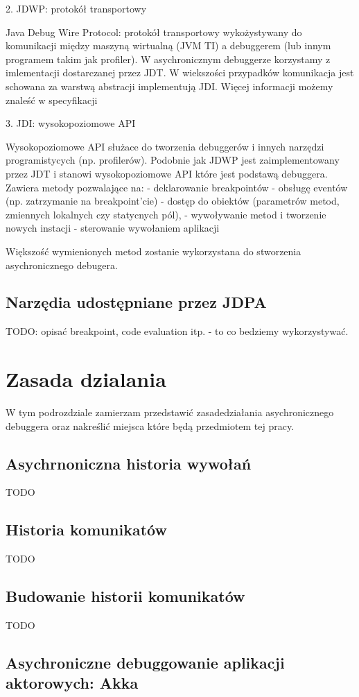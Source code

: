 2. JDWP: protokół transportowy

Java Debug Wire Protocol: protokół transportowy wykożystywany do komunikacji między maszyną wirtualną (JVM TI) a debuggerem (lub innym programem takim jak profiler). W asychronicznym debuggerze korzystamy z imlementacji dostarczanej przez JDT. W wiekszości przypadków komunikacja jest schowana za warstwą abstracji implementują JDI. Więcej informacji możemy znaleść w specyfikacji\cite{jwdpSpec}

3. JDI: wysokopoziomowe API

Wysokopoziomowe API służace do tworzenia debuggerów i innych narzędzi programistycych (np. profilerów). Podobnie jak JDWP jest zaimplementowany przez JDT i stanowi wysokopoziomowe API które jest podstawą debuggera.
Zawiera metody pozwalające na:
- deklarowanie breakpointów
- obsługę eventów (np. zatrzymanie na breakpoint'cie)
- dostęp do obiektów (parametrów metod, zmiennych lokalnych czy statycnych pól),
- wywoływanie metod i tworzenie nowych instacji
- sterowanie wywołaniem aplikacji

Większość wymienionych metod zostanie wykorzystana do stworzenia asychronicznego debugera.

\subsection{Narzędia udostępniane przez JDPA}

TODO: opisać breakpoint, code evaluation itp. - to co bedziemy wykorzystywać.

\section{Zasada dzialania}

W tym podrozdziale zamierzam przedstawić zasadedziałania asychronicznego debuggera oraz nakreślić  miejsca które będą przedmiotem tej pracy.

\subsection{Asychrnoniczna historia wywołań}
TODO
\subsection{Historia komunikatów}
TODO
\subsection{Budowanie historii komunikatów}

TODO

\subsection{Asychroniczne debuggowanie aplikacji aktorowych: Akka}